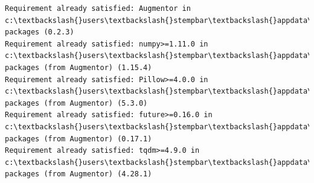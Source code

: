 \documentclass[11pt]{article}
\begin{document}
    \begin{Verbatim}[commandchars=\\\{\}]
Requirement already satisfied: Augmentor in c:\textbackslash{}users\textbackslash{}stempbar\textbackslash{}appdata\textbackslash{}local\textbackslash{}continuum\textbackslash{}anaconda3\textbackslash{}envs\textbackslash{}pytorch\textbackslash{}lib\textbackslash{}site-packages (0.2.3)
Requirement already satisfied: numpy>=1.11.0 in c:\textbackslash{}users\textbackslash{}stempbar\textbackslash{}appdata\textbackslash{}local\textbackslash{}continuum\textbackslash{}anaconda3\textbackslash{}envs\textbackslash{}pytorch\textbackslash{}lib\textbackslash{}site-packages (from Augmentor) (1.15.4)
Requirement already satisfied: Pillow>=4.0.0 in c:\textbackslash{}users\textbackslash{}stempbar\textbackslash{}appdata\textbackslash{}local\textbackslash{}continuum\textbackslash{}anaconda3\textbackslash{}envs\textbackslash{}pytorch\textbackslash{}lib\textbackslash{}site-packages (from Augmentor) (5.3.0)
Requirement already satisfied: future>=0.16.0 in c:\textbackslash{}users\textbackslash{}stempbar\textbackslash{}appdata\textbackslash{}local\textbackslash{}continuum\textbackslash{}anaconda3\textbackslash{}envs\textbackslash{}pytorch\textbackslash{}lib\textbackslash{}site-packages (from Augmentor) (0.17.1)
Requirement already satisfied: tqdm>=4.9.0 in c:\textbackslash{}users\textbackslash{}stempbar\textbackslash{}appdata\textbackslash{}local\textbackslash{}continuum\textbackslash{}anaconda3\textbackslash{}envs\textbackslash{}pytorch\textbackslash{}lib\textbackslash{}site-packages (from Augmentor) (4.28.1)

    \end{Verbatim}
\end{document}
